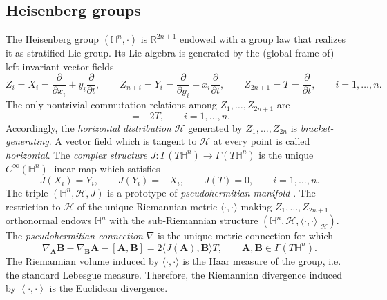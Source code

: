 \documentclass[11pt]{amsart}
\newcommand{\hhh}{{\mathcal{H}}}
\newcommand{\hn}{\mathbb{H}^n}
\newcommand{\A}{\mathbf{A}}
\newcommand{\B}{\mathbf{B}}
\newcommand{\hh}{{\mathbb{H}}}
\theoremstyle{definition}
\theoremstyle{remark}
\numberwithin{equation}{section}
\begin{document}
\subsection{Heisenberg groups}\label{subsec_hg} The Heisenberg group $(\hn,\cdot)$ is $\mathbb R^{2n+1}$ endowed with a group law
that realizes it as stratified Lie group. Its Lie algebra is generated by the (global frame of) left-invariant vector fields 
\begin{equation*}
    Z_i=X_i=\frac{\partial}{\partial x_i}+y_i\frac{\partial}{\partial t},\qquad Z_{n+i}=Y_i=\frac{\partial}{\partial y_i}-x_i\frac{\partial}{\partial t},\qquad Z_{2n+1}=T=\frac{\partial}{\partial t},\qquad i=1,\ldots,n.
\end{equation*}
The only nontrivial commutation relations among $Z_1,\ldots,Z_{2n+1}$ are
\begin{equation*}
    [X_i,Y_i]=-2T,\qquad i=1,\ldots,n.
\end{equation*}
Accordingly, the \emph{horizontal distribution} $\hhh$ generated by $Z_1,\ldots,Z_{2n}$ is \emph{bracket-generating}. A vector field which is tangent to $\hhh$ at every point is called \emph{horizontal}. %
The \emph{complex structure} $J:\Gamma(T\hh^n)\longrightarrow\Gamma(T\hh^n)$ is the unique $C^\infty(\hh^n)$-linear map which satisfies
\begin{equation*}
    J(X_i)=Y_i,\qquad J(Y_i)=-X_i,\qquad J(T)=0,\qquad i=1,\ldots,n.
\end{equation*}
 The triple $(\hh^n,\hhh,J)$ is a prototype of \emph{pseudohermitian manifold}  \cite[Appendix]{MR2165405}. 
The restriction to $\hhh$ of the unique Riemannian metric $\langle\cdot,\cdot\rangle$ making $Z_1,\ldots,Z_{2n+1}$ orthonormal endows $\hh^n$ with the sub-Riemannian structure $\left(\hh^n,\hhh,\langle\cdot,\cdot\rangle|_\hhh\right).$ 
 The \emph{pseudohermitian connection} $\nabla$ \cite{MR4193432} is the unique metric connection for which
\begin{equation}\label{pseudotorsion}
        \nabla_\A\B-\nabla_\B \A-[\A,\B]=2\langle J(\A),\B\rangle T,\qquad \A,\B\in\Gamma(T\hh^n).
\end{equation}
 The Riemannian volume induced by $\langle\cdot,\cdot\rangle$ is the Haar measure of the group, i.e. the standard Lebesgue measure.  Therefore, the Riemannian divergence induced by $\left\langle\cdot,\cdot\right\rangle$ is the Euclidean divergence.
\end{document}
